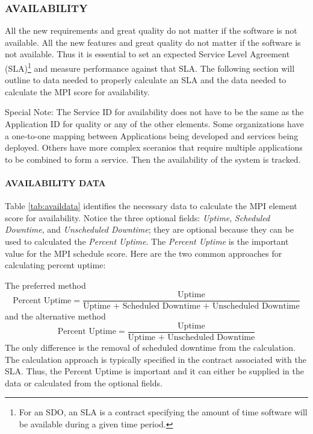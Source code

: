 \documentclass[SDSUThesis.tex]{subfiles}
\begin{document}
        \subsubsection{AVAILABILITY}
            All the new requirements and great quality do not matter if the software is not available.
            All the new features and great quality do not matter if the software is not available.  Thus it
            is essential to set an expected Service Level Agreement (SLA)\footnote{For an SDO, an SLA is a 
            contract specifying the amount of time software will be available during a
            given time period. } and measure 
            performance against that SLA.  The following section will outline to data needed to properly
            calculate an SLA and the data needed to calculate the MPI score for availability.
            
            Special Note: The Service ID for availability does not have to be the same
            as the Application ID for quality or any of the other elements.  Some 
            organizations have a one-to-one mapping between Applications being developed
            and services being deployed.  Others have more complex sceranios that require
            multiple applications to be combined to form a service.  Then the availability
            of the system is tracked.
            
            \paragraph{AVAILABILITY DATA}
                Table \ref{tab:availdata} identifies the necessary data to calculate
                the MPI element score for availability.  Notice the three optional 
                fields: \textit{Uptime}, \textit{Scheduled Downtime}, and 
                \textit{Unscheduled Downtime}; they are optional because they can be
                used to calculated the \textit{Percent Uptime}.  The \textit{Percent Uptime}
                is the important value for the MPI schedule score.  Here are the two common
                approaches for calculating percent uptime:
                
                The preferred method
                \[
                    \text{Percent Uptime} = \frac{\text{Uptime}}{\text{Uptime + Scheduled Downtime + Unscheduled Downtime}}
                \]
                and the alternative method
                \[
                    \text{Percent Uptime} = \frac{\text{Uptime}}{\text{Uptime + Unscheduled Downtime}}
                \]
                The only difference is the removal of scheduled downtime from 
                the calculation.  The calculation approach is typically specified in
                the contract associated with the SLA.  Thus, the Percent Uptime is important
                and it can either be supplied in the data or calculated from the 
                optional fields.
            
\end{document}
